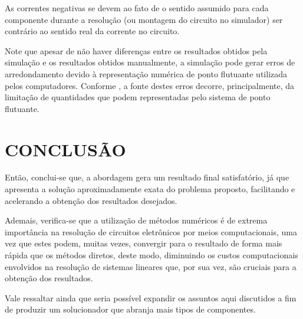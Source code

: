 \documentclass[twocolumn, 10pt]{extarticle}
\begin{document}
As correntes negativas se devem ao fato de o sentido assumido para cada componente durante a resolução (ou montagem do circuito no simulador) ser contrário ao sentido real da corrente no circuito.

Note que apesar de não haver diferenças entre os resultados obtidos pela simulação e os resultados obtidos manualmente, a simulação pode gerar erros de arredondamento devido à representação numérica de ponto flutuante utilizada pelos computadores. Conforme \cite{chapra}, a fonte destes erros decorre, principalmente, da limitação de quantidades que podem representadas pelo sistema de ponto flutuante.
\section{CONCLUSÃO}

Então, conclui-se que, a abordagem gera um resultado final satisfatório, já que apresenta a solução aproximadamente exata do problema proposto, facilitando e acelerando a obtenção dos resultados desejados. 

Ademais, verifica-se que a utilização de métodos numéricos é de extrema importância na resolução de circuitos eletrônicos por meios computacionais, uma vez que estes podem, muitas vezes, convergir  para o resultado de forma mais rápida que os métodos diretos, deste modo, diminuindo os custos computacionais envolvidos na resolução de sistemas lineares que, por sua vez, são cruciais para a obtenção dos resultados.

Vale ressaltar ainda que seria possível expandir os assuntos aqui discutidos a fim de produzir um solucionador que abranja mais tipos de componentes.

\newpage

\renewcommand{\refname}{REFERÊNCIAS}

\end{document}
